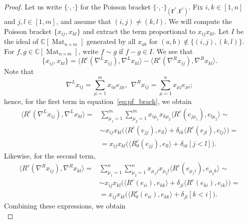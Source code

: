 \documentclass[11pt]{article}
\newcommand{\bbg}{\bar{\mathbf{\Gamma}}}
\DeclareMathOperator{\Mat}{Mat}
\theoremstyle{definition}\newtheorem{definition}[theorem]{Definition}
\theoremstyle{definition}\newtheorem{remark}[theorem]{Remark}
\theoremstyle{remark}
\numberwithin{equation}{section}
\begin{document}
\begin{proof}
    Let us write $\{\cdot,\cdot\}$ for the Poisson bracket $\{\cdot,\cdot\}_{(\bbg^r,\bbg^c)}$. Fix $i,k \in [1,n]$ and $j,l \in [1,m]$, and assume that $(i,j)\neq (k,l)$. We will compute the Poisson bracket $\{x_{ij},x_{kl}\}$ and extract the term proportional to $x_{ij}x_{kl}$. 
    Let $I$ be the ideal of $\mathbb{C}[\Mat_{n\times m}]$ generated by all $x_{ab}$ for $(a,b) \notin \{(i,j),(k,l)\}$. For $f,g \in \mathbb{C}[\Mat_{n\times m}]$, write $f\sim g$ if $f-g \in I$. We see that
   \begin{equation}\label{eq:pf_brack}
       \{x_{ij},x_{kl}\} = \langle R^c(\nabla^L x_{ij}), \nabla^L x_{kl} \rangle - \langle R^r(\nabla^R x_{ij}), \nabla^R x_{kl} \rangle.
   \end{equation}
    Note that
    \begin{equation*}
        \nabla^L x_{ij} = \sum_{\mu=1}^m x_{i\mu} e_{j\mu}, \ \ \nabla^R x_{ij} = \sum_{\mu=1}^n x_{\mu j} e_{\mu i};
    \end{equation*}
   hence, for the first term in equation~\eqref{eq:pf_brack}, we obtain
   \begin{equation*}\begin{split}
       \langle R^c(\nabla^L x_{ij}),\nabla^L x_{kl} \rangle = &\sum_{\mu_1=1}^m\sum_{\mu_2=1}^m x_{i\mu_1}x_{k\mu_2} \langle R^c(e_{j\mu_1}),e_{l\mu_2}\rangle\sim\\ &\sim x_{ij}x_{kl}\big(\langle R^c(e_{jj}),e_{ll}\rangle + \delta_{ik}\langle R^c(e_{jl}),e_{lj}\rangle \big) = \\ &= x_{ij}x_{kl}\big( \langle R_0^c(e_{jj}),e_{ll}\rangle + \delta_{ik}[j<l] \big).
       \end{split}
   \end{equation*}
   Likewise, for the second term,
   \begin{equation*}\begin{split}
       \langle R^r(\nabla^R x_{ij}),\nabla^R x_{kl} \rangle = &\sum_{\mu_1=1}^n\sum_{\mu_2=1}^n x_{\mu_1 j} x_{\mu_2 l} \langle R^r(e_{\mu_1 i}),e_{\mu_2 k}\rangle \sim \\ &\sim x_{ij}x_{kl} \big(\langle R^r(e_{ii}),e_{kk}\rangle + \delta_{jl} \langle R^r(e_{ki}),e_{ik}\rangle \big) = \\ &=x_{ij}x_{kl} \big( \langle R_0^r(e_{ii}),e_{kk}\rangle + \delta_{jl} [k < i] \big).
   \end{split}
   \end{equation*}
   Combining these expressions, we obtain
    \begin{equation*}

\end{equation*}
\end{proof}
\end{document}
